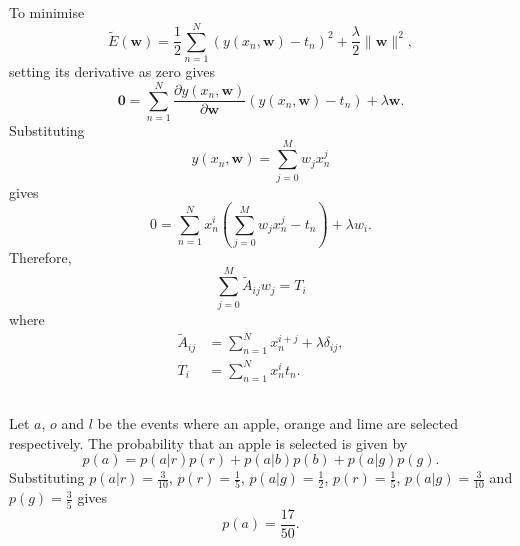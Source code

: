 \subsection{}
To minimise 
%
\begin{equation}
\tilde{E}(\textbf{w}) = \frac{1}{2} \sum_{n = 1}^{N} \left( y(x_n, \textbf{w}) - t_n \right) ^ 2 + \frac{\lambda}{2} \lVert \textbf{w} \rVert ^ 2,
\end{equation}
%
setting its derivative as zero gives
%
\begin{equation}
\textbf{0} = \sum_{n = 1}^{N} \frac{\partial y(x_n, \textbf{w})}{\partial \textbf{w}} \left( y(x_n, \textbf{w}) - t_n \right) + \lambda \textbf{w}.
\end{equation}
%
Substituting 
%
\begin{equation}
y(x_n, \textbf{w}) = \sum_{j = 0}^{M} w_j x_n^j
\end{equation}
%
gives
%
\begin{equation}
0 = \sum_{n = 1}^{N} x_n^i \left( \sum_{j = 0}^{M} w_j x_n^j - t_n \right) + \lambda w_i.
\end{equation}
%
Therefore,
%
\begin{equation}
\sum_{j = 0}^{M} \tilde{A}_{ij} w_j = T_i
\end{equation}
%
where
%
\begin{equation}
\begin{aligned}
\tilde{A}_{ij} &= \sum_{n = 1}^{N} x_n^{i + j} + \lambda \delta_{ij}, \\
T_i &= \sum_{n = 1}^{N} x_n^i t_n.
\end{aligned}
\end{equation}


\subsection{}
Let $a$, $o$ and $l$ be the events where an apple, orange and lime are selected respectively.
The probability that an apple is selected is given by
%
\begin{equation}
p(a) = p(a | r) p(r) + p(a | b) p(b) + p(a | g) p(g).
\end{equation}
%
Substituting $p(a | r) = \frac{3}{10}$, $p(r) = \frac{1}{5}$, $p(a | g) = \frac{1}{2}$, $p(r) = \frac{1}{5}$, $p(a | g) = \frac{3}{10}$ and $p(g) = \frac{3}{5}$ gives
%
\begin{equation}
p(a) = \frac{17}{50}.
\end{equation}
%

